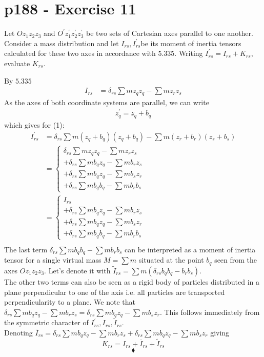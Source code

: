 \section{p188 - Exercise 11}
\begin{tcolorbox}
Let $Oz_1z_2z_3$ and $O^{'}z^{'}_1z^{'}_2z^{'}_3$ be two sets of Cartesian axes parallel to one another. Consider a mass distribution and let $I_{rs}, I^{'}_{rs}$be its moment of inertia tensors calculated for these two axes in accordance with $\mathbf{5.335}$. Writing $ I^{'}_{rs}=I_{rs}+K_{rs}$, evaluate $K_{rs}$.
\end{tcolorbox}
By  $\mathbf{5.335}$
\begin{align}
I_{rs}&= \delta_{rs}\sum m z_qz_q - \sum m z_r z_s
\end{align}
As the axes of both coordinate systems are parallel, we can write
\begin{align}
z^{'}_q = z_q + b_q
\end{align}
which gives for (1):
\begin{align}
I_{rs}^{'}&= \delta_{rs}\sum m \left(z_q + b_q\right)\left(z_q + b_q\right) - \sum m \left(z_r + b_r\right) \left(z_s + b_s\right)\\
&=\left\{\begin{array}{l}\delta_{rs}\sum m z_q z_q  - \sum m z_r z_s\\ +\delta_{rs}\sum m b_qz_q - \sum m  b_rz_s \\+\delta_{rs}\sum m b_qz_q - \sum m  b_sz_r \\+\delta_{rs}\sum m  b_qb_q- \sum mb_rb_s\end{array}\right.\\
&=\left\{\begin{array}{l}I_{rs}\\ +\delta_{rs}\sum m b_qz_q - \sum m  b_rz_s \\+\delta_{rs}\sum m b_qz_q - \sum m  b_sz_r \\+\delta_{rs}\sum m  b_qb_q- \sum mb_rb_s\end{array}\right.\\
\end{align}
The last term $\delta_{rs}\sum m  b_qb_q- \sum mb_rb_s$ can be interpreted as a  moment of inertia tensor for a single  virtual mass $M=\sum m$ situated at the point $b_q$ seen from the axes $Oz_1z_2z_3$. Let's denote it with $\tilde{I}_{rs}= \sum m \left(\delta_{rs} b_qb_q- b_rb_s\right)$.\\
The other two terms can also be seen as a rigid body of particles distributed in a plane perpendicular to one of the axis i.e. all particles are transported perpendicularity to a plane. We note that $\delta_{rs}\sum m b_qz_q - \sum m  b_rz_s = \delta_{rs}\sum m b_qz_q - \sum m  b_sz_r$. This follows immediately from the symmetric character of $I_{rs}^{'},I_{rs}^{},\tilde{I}_{rs}$. \\ Denoting $\overline{I}_{rs}= \delta_{rs}\sum m b_qz_q - \sum m  b_rz_s +\delta_{rs}\sum m b_qz_q - \sum m  b_sz_r$ giving
$$ K_{rs} = I_{rs}+\overline{I}_{rs}+\tilde{I}_{rs}$$
$$\blacklozenge$$
\newpage

